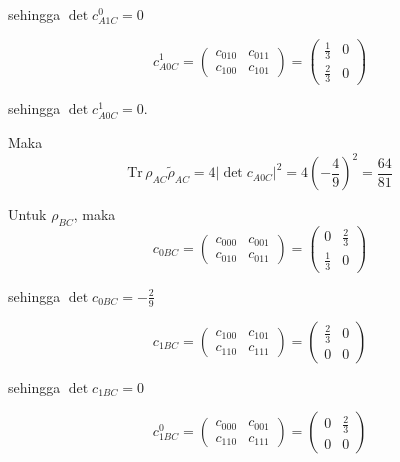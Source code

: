 \begin{enumerate}
	sehingga $\det c_{A1C}^0 = 0$
	
	\begin{equation}
		c_{A0C}^1=
		\begin{pmatrix}
			c_{010} & c_{011} \\
			c_{100} & c_{101}
		\end{pmatrix}=
		\begin{pmatrix}
			\frac{1}{3} & 0 \\
			\frac{2}{3} & 0
		\end{pmatrix}
	\end{equation}
	
	sehingga $\det c_{A0C}^1 = 0$.
	
	Maka
	\begin{equation}
		\mathrm{Tr}\,\rho_{AC}\tilde{\rho}_{AC}=4|\det c_{A0C}|^2=4(-\frac{4}{9})^2=\frac{64}{81}
	\end{equation}
	
	Untuk $\rho_{BC}$, maka
	\begin{equation}
		c_{0BC}=
		\begin{pmatrix}
			c_{000} & c_{001} \\
			c_{010} & c_{011}
		\end{pmatrix}=
		\begin{pmatrix}
			0 & \frac{2}{3} \\
			\frac{1}{3} & 0
		\end{pmatrix}
	\end{equation}
	
	sehingga $\det c_{0BC} = -\frac{2}{9}$
	
	\begin{equation}
		c_{1BC}=
		\begin{pmatrix}
			c_{100} & c_{101} \\
			c_{110} & c_{111}
		\end{pmatrix}=
		\begin{pmatrix}
			\frac{2}{3} & 0 \\
			0 & 0
		\end{pmatrix}
	\end{equation}
	
	sehingga $\det c_{1BC} = 0$
	
	\begin{equation}
		c_{1BC}^0=
		\begin{pmatrix}
			c_{000} & c_{001} \\
			c_{110} & c_{111}
		\end{pmatrix}=
		\begin{pmatrix}
			0 & \frac{2}{3} \\
			0 & 0
		\end{pmatrix}
	\end{equation}
	

\end{enumerate}
